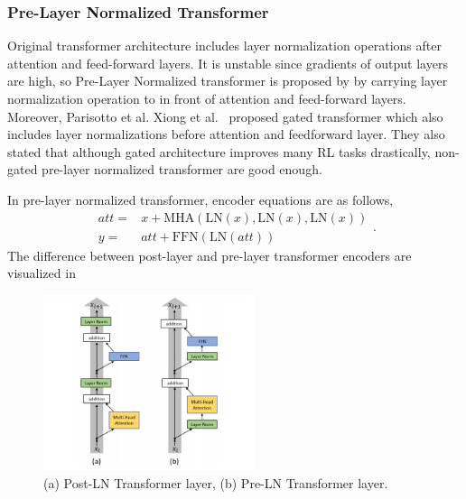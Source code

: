 \subsubsection{Pre-Layer Normalized Transformer}

Original transformer architecture includes layer normalization operations after attention and feed-forward layers. 
It is unstable since gradients of output layers are high, so Pre-Layer Normalized transformer is proposed by \cite{xiong_layer_2020} by carrying layer normalization operation to in front of attention and feed-forward layers. 
Moreover, Parisotto et al. Xiong et al.~ \cite{parisotto_stabilizing_2019} proposed gated transformer which also includes layer normalizations before attention and feedforward layer. 
They also stated that although gated architecture improves many RL tasks drastically, non-gated pre-layer normalized transformer are good enough. 

In pre-layer normalized transformer, encoder equations are as follows,
\begin{equation}
\begin{split}
att = & x+ \mathrm{MHA}(\mathrm{LN}(x),\mathrm{LN}(x),\mathrm{LN}(x)) \\
y = & att+ \mathrm{FFN}(\mathrm{LN}(att))
\end{split}.
\end{equation}
The difference between post-layer and pre-layer transformer encoders are visualized in 

\begin{figure}
	\centering
	\includegraphics[width=0.55\textwidth]{figures/ml_theory/post_pre_trsf.png}
	\caption{(a) Post-LN Transformer layer, (b) Pre-LN Transformer
		layer.}
	\label{fig:post_pre_trsf}
\end{figure}


